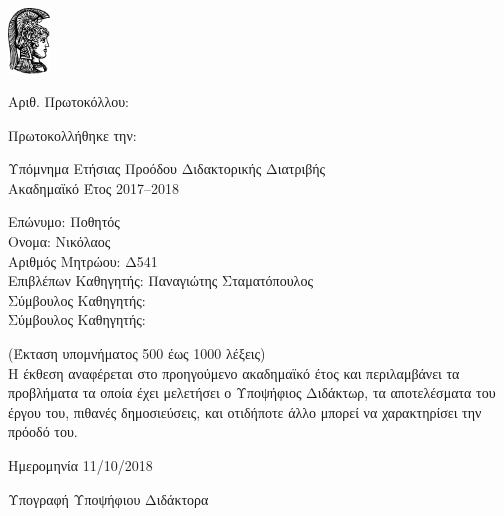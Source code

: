 \documentclass[a4paper]{article}
\begin{document}

\includegraphics[width=3em]{athena}

Αριθ. Πρωτοκόλλου:

Πρωτοκολλήθηκε την:

Υπόμνημα Ετήσιας Προόδου Διδακτορικής Διατριβής \\
Ακαδημαϊκό Έτος 2017–2018

Επώνυμο: Ποθητός \\
Ονομα: Νικόλαος \\
Αριθμός Μητρώου: Δ541 \\
Επιβλέπων Καθηγητής: Παναγιώτης Σταματόπουλος \\
Σύμβουλος Καθηγητής: \\
Σύμβουλος Καθηγητής:

(Έκταση υπομνήματος 500 έως 1000 λέξεις) \\
Η έκθεση αναφέρεται στο προηγούμενο ακαδημαϊκό έτος και περιλαμβάνει τα προβλήματα τα οποία έχει μελετήσει ο Υποψήφιος Διδάκτωρ, τα αποτελέσματα του έργου του, πιθανές δημοσιεύσεις, και οτιδήποτε άλλο μπορεί να χαρακτηρίσει την πρόοδό του.

Ημερομηνία 11/10/2018

Υπογραφή Υποψήφιου Διδάκτορα
\end{document}
